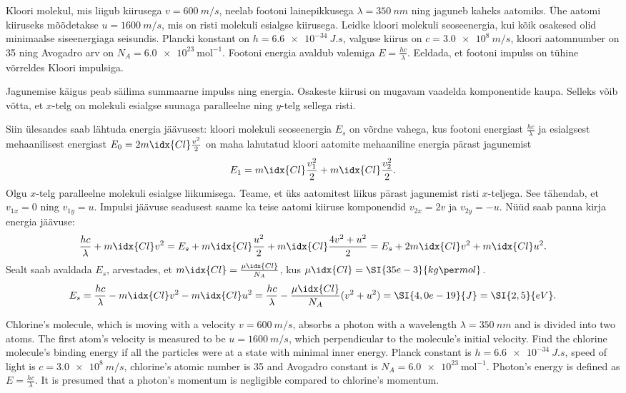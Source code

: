 
Kloori molekul, mis liigub kiirusega $v = \SI{600}{m/s}$, neelab
footoni lainepikkusega $\lambda = \SI{350}{nm}$ ning jaguneb kaheks aatomiks.
Ühe aatomi kiiruseks
mõõdetakse $ u = \SI{1600}{m/s}$, mis on risti molekuli esialgse
kiirusega. Leidke kloori molekuli seoseenergia, kui kõik osakesed olid
minimaalse siseenergiaga seisundis. Plancki konstant on $h =
\SI{6,6e-34}{J.s}$, valguse kiirus on $c = \SI{3,0e8}{m/s}$, kloori aatomnumber on 35 ning Avogadro arv on $N_A
= \SI{6,0e23}{\text{mol}^{-1}}$. Footoni energia avaldub valemiga $E =
\frac{h c}{\lambda}$. Eeldada, et footoni impulss on tühine võrreldes Kloori impulsiga.

\hint
Jagunemise käigus peab säilima summaarne impulss ning energia. Osakeste kiirusi on mugavam vaadelda komponentide kaupa. Selleks võib võtta, et $x$-telg on molekuli esialgse suunaga paralleelne ning $y$-telg sellega risti.

\solu
Siin ülesandes saab lähtuda energia jäävusest: kloori molekuli seoseenergia $E_s$ on võrdne vahega, kus footoni energiast $\frac{hc}{\lambda}$ ja esialgsest mehaanilisest energiast $E_0 = 2m\idx{Cl} \frac{v^2}{2} $ on maha lahutatud kloori aatomite mehaaniline energia pärast jagunemist
\[
E_1 = m\idx{Cl} \frac{v_1^2}{2} + m\idx{Cl} \frac{v_2^2}{2}.
\]
Olgu $x$-telg paralleelne molekuli esialgse liikumisega. Teame, et üks aatomitest liikus pärast jagunemist risti $x$-teljega. See tähendab, et $v_{1x} = 0$ ning $v_{1y} = u$. Impulsi jäävuse seadusest saame ka teise aatomi kiiruse komponendid $v_{2x} = 2 v$ ja $v_{2y} = -u$. Nüüd saab panna kirja energia jäävuse:
$$
	\frac{hc}{\lambda} + m\idx{Cl} v^2 = E_s + m\idx{Cl} \frac{u^2}{2} + m\idx{Cl} \frac{4v^2 + u^2}{2} = E_s + 2 m\idx{Cl} v^2 + m\idx{Cl} u^2.
$$
Sealt saab avaldada $E_s$, arvestades, et $m\idx{Cl} = \frac{\mu\idx{Cl}}{N_A}$, kus $\mu\idx{Cl} = \SI{35e-3}{kg\per mol}$.
$$ E_s = \frac{hc}{\lambda} - m\idx{Cl} v^2 - m\idx{Cl} u^2 = \frac{hc}{\lambda} - \frac{\mu\idx{Cl}}{N_A} (v^2 + u^2) = \SI{4,0e-19}{J} = \SI{2,5}{eV}.
$$

Chlorine’s molecule, which is moving with a velocity $v = \SI{600}{m/s}$, absorbs a photon with a wavelength $\lambda = \SI{350}{nm}$ and is divided into two atoms. The first atom’s velocity is measured to be $ u = \SI{1600}{m/s}$, which perpendicular to the molecule’s initial velocity. Find the chlorine molecule’s binding energy if all the particles were at a state with minimal inner energy. Planck constant is $h =
\SI{6,6e-34}{J.s}$, speed of light is $c = \SI{3,0e8}{m/s}$, chlorine’s atomic number is 35 and Avogadro constant is $N_A
= \SI{6,0e23}{\text{mol}^{-1}}$. Photon’s energy is defined as $E =
\frac{h c}{\lambda}$. It is presumed that a photon’s momentum is negligible compared to chlorine’s momentum.

